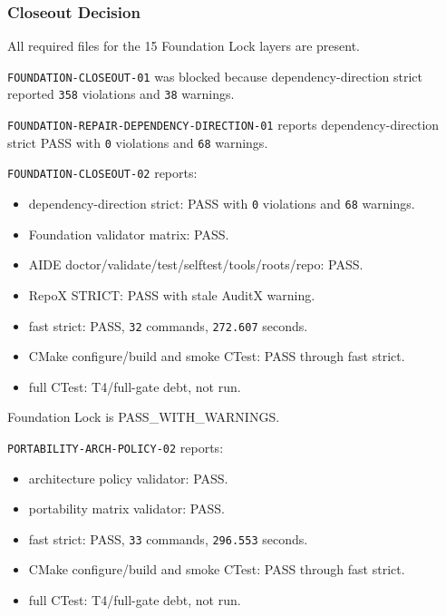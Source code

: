\documentclass[9pt,a4paper,openany]{book}
\begin{document}
\subsubsection{Closeout Decision}

All required files for the 15 Foundation Lock layers are present.\allowbreak{}


\texttt{FOUNDATION-\allowbreak{}CLOSEOUT-\allowbreak{}01} was blocked because dependency-\allowbreak{}direction strict reported \texttt{358} violations and \texttt{38} warnings.\allowbreak{}


\texttt{FOUNDATION-\allowbreak{}REPAIR-\allowbreak{}DEPENDENCY-\allowbreak{}DIRECTION-\allowbreak{}01} reports dependency-\allowbreak{}direction strict PASS with \texttt{0} violations and \texttt{68} warnings.\allowbreak{}


\texttt{FOUNDATION-\allowbreak{}CLOSEOUT-\allowbreak{}02} reports:


\begin{itemize}
\item dependency-\allowbreak{}direction strict: PASS with \texttt{0} violations and \texttt{68} warnings.\allowbreak{}
\item Foundation validator matrix: PASS.\allowbreak{}
\item AIDE doctor/\allowbreak{}validate/\allowbreak{}test/\allowbreak{}selftest/\allowbreak{}tools/\allowbreak{}roots/\allowbreak{}repo: PASS.\allowbreak{}
\item RepoX STRICT: PASS with stale AuditX warning.\allowbreak{}
\item fast strict: PASS, \texttt{32} commands, \texttt{272.\allowbreak{}607} seconds.\allowbreak{}
\item CMake configure/\allowbreak{}build and smoke CTest: PASS through fast strict.\allowbreak{}
\item full CTest: T4/\allowbreak{}full-\allowbreak{}gate debt, not run.\allowbreak{}
\end{itemize}

Foundation Lock is PASS\_\allowbreak{}WITH\_\allowbreak{}WARNINGS.\allowbreak{}


\texttt{PORTABILITY-\allowbreak{}ARCH-\allowbreak{}POLICY-\allowbreak{}02} reports:


\begin{itemize}
\item architecture policy validator: PASS.\allowbreak{}
\item portability matrix validator: PASS.\allowbreak{}
\item fast strict: PASS, \texttt{33} commands, \texttt{296.\allowbreak{}553} seconds.\allowbreak{}
\item CMake configure/\allowbreak{}build and smoke CTest: PASS through fast strict.\allowbreak{}
\item full CTest: T4/\allowbreak{}full-\allowbreak{}gate debt, not run.\allowbreak{}
\end{itemize}
\end{document}
